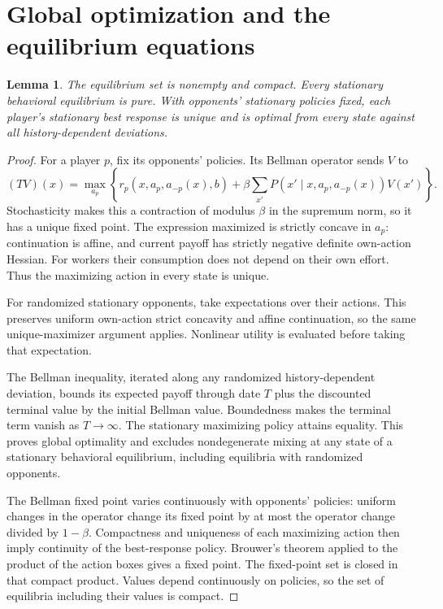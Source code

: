 \documentclass[11pt]{article}
\newtheorem{lemma}{Lemma}
\begin{document}
\section{Global optimization and the equilibrium equations}
\begin{lemma}\label{lem:equilibrium}
The equilibrium set is nonempty and compact. Every stationary behavioral equilibrium is pure. With opponents' stationary policies fixed, each player's stationary best response is unique and is optimal from every state against all history-dependent deviations.
\end{lemma}
\begin{proof}
For a player $p$, fix its opponents' policies. Its Bellman operator sends $V$ to
\[
 (TV)(x)=\max_{a_p}\left\{r_p(x,a_p,a_{-p}(x),b)
        +\beta\sum_{x'}P(x'\mid x,a_p,a_{-p}(x))V(x')\right\}.
\]
Stochasticity makes this a contraction of modulus $\beta$ in the supremum norm, so it has a unique fixed point. The expression maximized is strictly concave in $a_p$: continuation is affine, and current payoff has strictly negative definite own-action Hessian. For workers their consumption does not depend on their own effort. Thus the maximizing action in every state is unique.

For randomized stationary opponents, take expectations over their actions. This preserves uniform own-action strict concavity and affine continuation, so the same unique-maximizer argument applies. Nonlinear utility is evaluated before taking that expectation.

The Bellman inequality, iterated along any randomized history-dependent deviation, bounds its expected payoff through date $T$ plus the discounted terminal value by the initial Bellman value. Boundedness makes the terminal term vanish as $T\to\infty$. The stationary maximizing policy attains equality. This proves global optimality and excludes nondegenerate mixing at any state of a stationary behavioral equilibrium, including equilibria with randomized opponents.

The Bellman fixed point varies continuously with opponents' policies: uniform changes in the operator change its fixed point by at most the operator change divided by $1-\beta$. Compactness and uniqueness of each maximizing action then imply continuity of the best-response policy. Brouwer's theorem \cite{brouwer} applied to the product of the action boxes gives a fixed point. The fixed-point set is closed in that compact product. Values depend continuously on policies, so the set of equilibria including their values is compact.
\end{proof}
\end{document}
